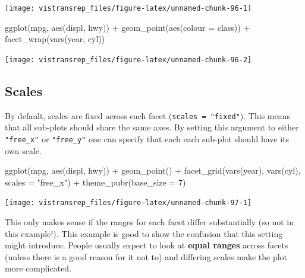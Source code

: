 \documentclass[]{book}
\newenvironment{Shaded}{}{}
\newcommand{\DataTypeTok}[1]{#1}
\newcommand{\DecValTok}[1]{#1}
\newcommand{\KeywordTok}[1]{\textcolor[rgb]{0.00,0.00,1.00}{#1}}
\newcommand{\NormalTok}[1]{#1}
\newcommand{\OperatorTok}[1]{#1}
\newcommand{\StringTok}[1]{\textcolor[rgb]{0.00,0.50,0.50}{#1}}
\begin{document}
\begin{flushright}\texttt{[image: vistransrep\_files/figure-latex/unnamed-chunk-96-1]} \end{flushright}

\begin{Shaded}
\begin{Highlighting}[]
\KeywordTok{ggplot}\NormalTok{(mpg, }\KeywordTok{aes}\NormalTok{(displ, hwy)) }\OperatorTok{+}
\StringTok{  }\KeywordTok{geom_point}\NormalTok{(}\KeywordTok{aes}\NormalTok{(}\DataTypeTok{colour =}\NormalTok{ class)) }\OperatorTok{+}
\StringTok{  }\KeywordTok{facet_wrap}\NormalTok{(}\KeywordTok{vars}\NormalTok{(year, cyl))}
\end{Highlighting}
\end{Shaded}

\begin{flushright}\texttt{[image: vistransrep\_files/figure-latex/unnamed-chunk-96-2]} \end{flushright}

\hypertarget{scales-1}{%
\subsection{Scales}\label{scales-1}}

By default, scales are fixed across each facet (\texttt{scales\ =\ "fixed"}).
This means that all sub-plots should share the same axes.
By setting this argument to either \texttt{"free\_x"} or \texttt{"free\_y"} one can specify that each each sub-plot should have its own scale.

\begin{Shaded}
\begin{Highlighting}[]
\KeywordTok{ggplot}\NormalTok{(mpg, }\KeywordTok{aes}\NormalTok{(displ, hwy)) }\OperatorTok{+}
\StringTok{  }\KeywordTok{geom_point}\NormalTok{() }\OperatorTok{+}
\StringTok{  }\KeywordTok{facet_grid}\NormalTok{(}\KeywordTok{vars}\NormalTok{(year), }\KeywordTok{vars}\NormalTok{(cyl), }\DataTypeTok{scales =} \StringTok{"free_x"}\NormalTok{) }\OperatorTok{+}
\StringTok{  }\KeywordTok{theme_pubr}\NormalTok{(}\DataTypeTok{base_size =} \DecValTok{7}\NormalTok{)}
\end{Highlighting}
\end{Shaded}

\begin{flushright}\texttt{[image: vistransrep\_files/figure-latex/unnamed-chunk-97-1]} \end{flushright}

This only makes sense if the ranges for each facet differ substantially (so not in this example!).
This example is good to show the confusion that this setting might introduce.
People usually expect to look at \textbf{equal ranges} across facets (unless there is a good reason for it not to) and differing scales make the plot more complicated.
\end{document}
